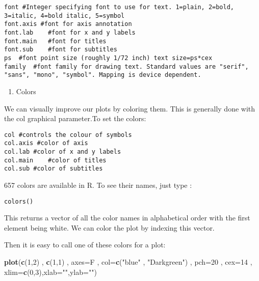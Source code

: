 \documentclass[]{book}
\newenvironment{Shaded}{\begin{snugshade}}{\end{snugshade}}
\newcommand{\KeywordTok}[1]{\textcolor[rgb]{0.13,0.29,0.53}{\textbf{#1}}}
\newcommand{\DataTypeTok}[1]{\textcolor[rgb]{0.13,0.29,0.53}{#1}}
\newcommand{\DecValTok}[1]{\textcolor[rgb]{0.00,0.00,0.81}{#1}}
\newcommand{\StringTok}[1]{\textcolor[rgb]{0.31,0.60,0.02}{#1}}
\newcommand{\NormalTok}[1]{#1}
\providecommand{\tightlist}{%
  \setlength{\itemsep}{0pt}\setlength{\parskip}{0pt}}
\theoremstyle{definition}
\theoremstyle{definition}
\theoremstyle{definition}
\theoremstyle{remark}
\begin{document}
\begin{verbatim}
font #Integer specifying font to use for text. 1=plain, 2=bold, 3=italic, 4=bold italic, 5=symbol
font.axis #font for axis annotation
font.lab    #font for x and y labels
font.main   #font for titles
font.sub    #font for subtitles
ps  #font point size (roughly 1/72 inch) text size=ps*cex
family  #font family for drawing text. Standard values are "serif", "sans", "mono", "symbol". Mapping is device dependent.
\end{verbatim}

\begin{enumerate}
\def\labelenumi{(\arabic{enumi})}
\setcounter{enumi}{4}
\tightlist
\item
  Colors
\end{enumerate}

We can visually improve our plots by coloring them. This is generally
done with the col graphical parameter.To set the colors:

\begin{verbatim}
col #controls the colour of symbols
col.axis #color of axis 
col.lab #color of x and y labels 
col.main    #color of titles 
col.sub #color of subtitles
\end{verbatim}

657 colors are available in R. To see their names, just type :

\begin{verbatim}
colors()
\end{verbatim}

This returns a vector of all the color names in alphabetical order with
the first element being white. We can color the plot by indexing this
vector.

Then it is easy to call one of these colors for a plot:

\begin{Shaded}
\begin{Highlighting}[]
\KeywordTok{plot}\NormalTok{(}\KeywordTok{c}\NormalTok{(}\DecValTok{1}\NormalTok{,}\DecValTok{2}\NormalTok{) , }\KeywordTok{c}\NormalTok{(}\DecValTok{1}\NormalTok{,}\DecValTok{1}\NormalTok{) , }\DataTypeTok{axes=}\NormalTok{F , }\DataTypeTok{col=}\KeywordTok{c}\NormalTok{(}\StringTok{"blue"}\NormalTok{ , }\StringTok{"Darkgreen"}\NormalTok{) , }\DataTypeTok{pch=}\DecValTok{20}\NormalTok{ , }\DataTypeTok{cex=}\DecValTok{14}\NormalTok{ , }\DataTypeTok{xlim=}\KeywordTok{c}\NormalTok{(}\DecValTok{0}\NormalTok{,}\DecValTok{3}\NormalTok{),}\DataTypeTok{xlab=}\StringTok{""}\NormalTok{,}\DataTypeTok{ylab=}\StringTok{""}\NormalTok{)}
\end{Highlighting}
\end{Shaded}
\end{document}
